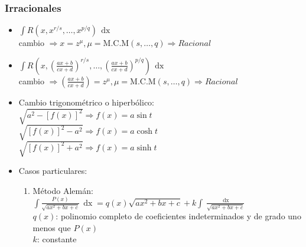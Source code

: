 \documentclass[8pt]{article}
\DeclareMathOperator{\xder}{\, \mathrm{d}x}
\begin{document}
		\subsubsection{Irracionales}
			\begin{itemize}
				\item $ \int R (x, x^{r/s}, \dots , x^{p/q}) \xder $\\
					cambio $ \Rightarrow x = z^{\mu},
					\mu = \text{M.C.M} (s, \dots, q) \Rightarrow Racional $
				\item $ \int R (x, (\frac{ax+b}{cx+d})^{r/s}, \dots, 
					(\frac{ax+b}{cx+d})^{p/q}) \xder $\\
					cambio $ \Rightarrow (\frac{ax+b}{cx+d}) = z^{\mu},
					\mu = \text{M.C.M} (s, \dots, q) \Rightarrow Racional $
				\item Cambio trigonométrico o hiperbólico:\\
					$ \sqrt{a^2 - [f(x)]^2} \Rightarrow f(x) = a \sin t $\\
					$ \sqrt{[f(x)]^2 - a^2} \Rightarrow f(x) = a \cosh t $\\
					$ \sqrt{[f(x)]^2 + a^2} \Rightarrow f(x) = a \sinh t $
				\item Casos particulares:
					\begin{enumerate}
						\item Método Alemán:
							$ \int \frac{P(x)}{\sqrt{a x^2 + bx + c}} \xder =
							q(x) \sqrt{a x^2 + bx + c} + k \int \frac{\xder}{\sqrt{a x^2 + bx + c}} $\\

							$ q(x) $: polinomio completo de coeficientes indeterminados y
							de grado uno menos que $ P(x) $\\
							$ k $: constante
								

\end{enumerate}
\end{itemize}
\end{document}
